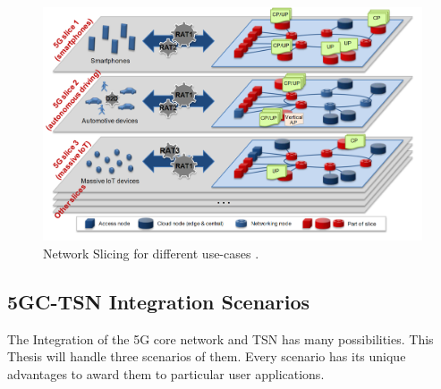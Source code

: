 \begin{figure}

\centering
\includegraphics[scale=0.33]{images/Network Slicing for different use-cases.png}
\caption{Network Slicing for different use-cases \cite{alliance20155g}.}
\label{fig:Network_Slicing_for_different_use-cases}
\end{figure}


\subsection{5GC-TSN Integration Scenarios}
The Integration of the 5G core network and TSN has many possibilities. This Thesis will handle three scenarios of them. Every scenario has its unique advantages to award them to particular user applications\cite{5gacia2021_study}. 
 
